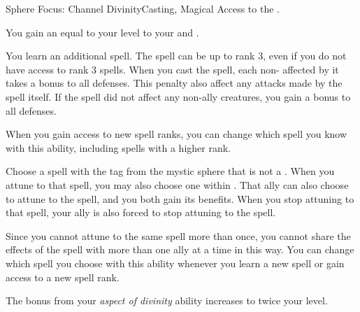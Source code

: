     \begin{magicalfeat}{Sphere Focus: Channel Divinity}{Casting, Magical}
        \featpre Access to the  .

         You gain an  equal to your level to your  and .

         You learn an additional spell.
        The spell can be up to rank 3, even if you do not have access to rank 3 spells.
        When you cast the spell, each non- affected by it  takes a  bonus to all defenses.
        This penalty also affect any attacks made by the spell itself.
        If the spell did not affect any non-ally creatures, you  gain a  bonus to all defenses.

        When you gain access to new spell ranks, you can change which spell you know with this ability, including spells with a higher rank.

         Choose a spell with the  tag from the  mystic sphere that is not a .
        When you attune to that spell, you may also choose one  within \medrange.
        That ally can also choose to attune to the spell, and you both gain its benefits.
        When you stop attuning to that spell, your ally is also forced to stop attuning to the spell.

        Since you cannot attune to the same spell more than once, you cannot share the effects of the spell with more than one ally at a time in this way.
        You can change which spell you choose with this ability whenever you learn a new spell or gain access to a new spell rank.

         The bonus from your \textit{aspect of divinity} ability increases to twice your level.
    \end{magicalfeat}

